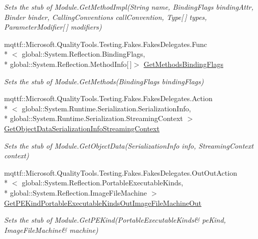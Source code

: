 \begin{DoxyCompactItemize}
\begin{DoxyCompactList}\small\item\em Sets the stub of Module.\-Get\-Method\-Impl(\-String name, Binding\-Flags binding\-Attr, Binder binder, Calling\-Conventions call\-Convention, Type\mbox{[}$\,$\mbox{]} types, Parameter\-Modifier\mbox{[}$\,$\mbox{]} modifiers)\end{DoxyCompactList}\item 
mqttf\-::\-Microsoft.\-Quality\-Tools.\-Testing.\-Fakes.\-Fakes\-Delegates.\-Func\\*
$<$ global\-::\-System.\-Reflection.\-Binding\-Flags, \\*
global\-::\-System.\-Reflection.\-Method\-Info\mbox{[}$\,$\mbox{]}$>$ \hyperlink{class_system_1_1_reflection_1_1_fakes_1_1_stub_module_abb6eaeeb3cdc32213f287cf392f0868a}{Get\-Methods\-Binding\-Flags}
\begin{DoxyCompactList}\small\item\em Sets the stub of Module.\-Get\-Methods(\-Binding\-Flags binding\-Flags)\end{DoxyCompactList}\item 
mqttf\-::\-Microsoft.\-Quality\-Tools.\-Testing.\-Fakes.\-Fakes\-Delegates.\-Action\\*
$<$ global\-::\-System.\-Runtime.\-Serialization.\-Serialization\-Info, \\*
global\-::\-System.\-Runtime.\-Serialization.\-Streaming\-Context $>$ \hyperlink{class_system_1_1_reflection_1_1_fakes_1_1_stub_module_aa85d2e1fc440c7c8e52221d00f5b9716}{Get\-Object\-Data\-Serialization\-Info\-Streaming\-Context}
\begin{DoxyCompactList}\small\item\em Sets the stub of Module.\-Get\-Object\-Data(\-Serialization\-Info info, Streaming\-Context context)\end{DoxyCompactList}\item 
mqttf\-::\-Microsoft.\-Quality\-Tools.\-Testing.\-Fakes.\-Fakes\-Delegates.\-Out\-Out\-Action\\*
$<$ global\-::\-System.\-Reflection.\-Portable\-Executable\-Kinds, \\*
global\-::\-System.\-Reflection.\-Image\-File\-Machine $>$ \hyperlink{class_system_1_1_reflection_1_1_fakes_1_1_stub_module_a954d56ec4d9f110b6bab8848b5913c53}{Get\-P\-E\-Kind\-Portable\-Executable\-Kinds\-Out\-Image\-File\-Machine\-Out}
\begin{DoxyCompactList}\small\item\em Sets the stub of Module.\-Get\-P\-E\-Kind(Portable\-Executable\-Kinds\& pe\-Kind, Image\-File\-Machine\& machine)\end{DoxyCompactList}\item 

\end{DoxyCompactItemize}
